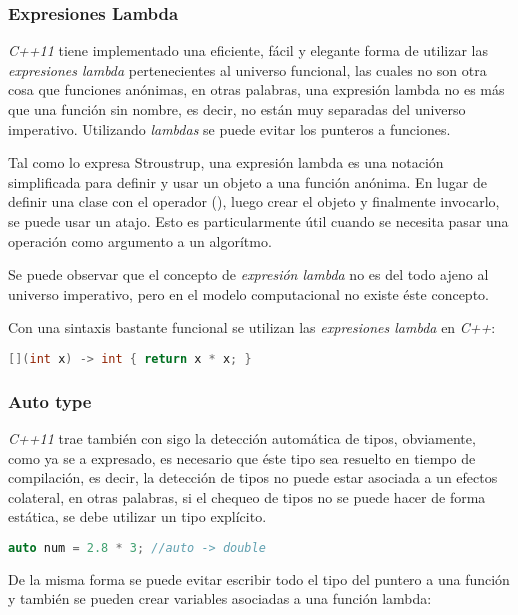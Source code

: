 	\subsubsection{Expresiones Lambda}
		\emph{C++11} tiene implementado una eficiente, fácil y elegante forma de utilizar las \emph{expresiones lambda} pertenecientes al universo funcional, las cuales no son otra cosa que funciones anónimas, en otras palabras, una expresión lambda no es más que una función sin nombre, es decir, no están muy separadas del universo imperativo. Utilizando \emph{lambdas} se puede evitar los punteros a funciones.
		
		Tal como lo expresa Stroustrup, una expresión lambda es una notación simplificada para definir y usar un objeto a una función anónima. En lugar de definir una clase con el operador (), luego crear el objeto y finalmente invocarlo, se puede usar un atajo. Esto es particularmente útil cuando se necesita pasar una operación como argumento a un algorítmo.\cite{Bjarne2013}
		
		Se puede observar que el concepto de \emph{expresión lambda} no es del todo ajeno al universo imperativo, pero en el modelo computacional no existe éste concepto.
		
		Con una sintaxis bastante funcional se utilizan las \emph{expresiones lambda} en \emph{C++}:
		
		\begin{lstlisting}[language=C++, caption=Lambda para elevar al cuadrado un número en C++]
			[](int x) -> int { return x * x; }
		\end{lstlisting}
	
	\subsubsection{Auto type}
		\emph{C++11} trae también con sigo la detección automática de tipos, obviamente, como ya se a expresado, es necesario que éste tipo sea resuelto en tiempo de compilación, es decir, la detección de tipos no puede estar asociada a un efectos colateral, en otras palabras, si el chequeo de tipos no se puede hacer de forma estática, se debe utilizar un tipo explícito.
	
		\begin{lstlisting}[language=C++, caption=Auto type en C++]
			auto num = 2.8 * 3; //auto -> double
		\end{lstlisting}
		
		De la misma forma se puede evitar escribir todo el tipo del puntero a una función y también se pueden crear variables asociadas a una función lambda:
		
